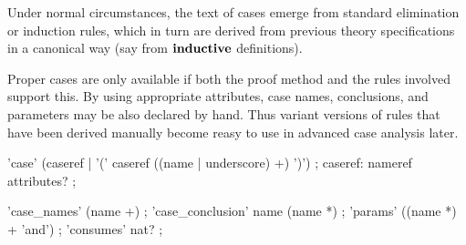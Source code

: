 Under normal circumstances, the text of cases emerge from standard elimination
or induction rules, which in turn are derived from previous theory
specifications in a canonical way (say from ${\mathord{\mathbf{inductive}}}$
definitions).

\medskip Proper cases are only available if both the proof method and the
rules involved support this.  By using appropriate attributes, case names,
conclusions, and parameters may be also declared by hand.  Thus variant
versions of rules that have been derived manually become reasy to use in
advanced case analysis later.

\begin{rail}
  'case' (caseref | '(' caseref ((name | underscore) +) ')')
  ;
  caseref: nameref attributes?
  ;

  'case\_names' (name +)
  ;
  'case\_conclusion' name (name *)
  ;
  'params' ((name *) + 'and')
  ;
  'consumes' nat?
  ;
\end{rail}

